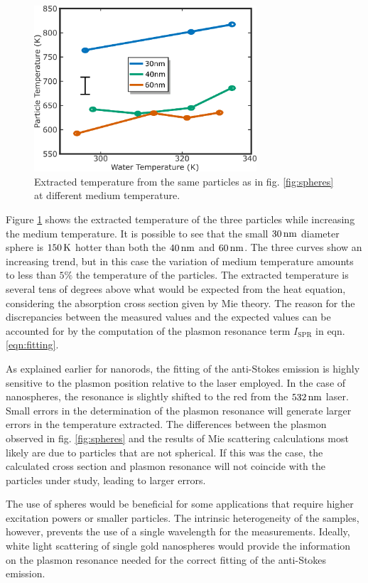 \begin{figure}[tp] \centering
\includegraphics[width=82.7mm]{Chapters/04_Anti-Stokes/Figures/07_Spheres/07_spheres_02.png}
\caption{Extracted temperature from the same particles as in fig.
\ref{fig:spheres} at different medium temperature.}
	\label{fig:spheres_temp}
\end{figure}

Figure \ref{fig:spheres_temp} shows the extracted temperature of the three
particles while increasing the medium temperature. It is possible to see that
the small $30\,\textrm{nm}$ diameter sphere is $150\,\textrm{K}$ hotter than both the $40\,\textrm{nm}$ and
$60\,\textrm{nm}$. The three curves show an increasing trend, but in this case the
variation of medium temperature amounts to less than $5\%$ the temperature of
the particles. The extracted temperature is several tens of degrees above what
would be expected from the heat equation, considering the absorption cross
section given by Mie theory. The reason for the discrepancies between the
measured values and the expected values can be accounted for by the computation
of the plasmon resonance term $I_\textrm{SPR}$ in eqn. \ref{eqn:fitting}.

As explained earlier for nanorods, the fitting of the anti-Stokes emission is
highly sensitive to the plasmon position relative to the laser employed. In the
case of nanospheres, the resonance is slightly shifted to the red from the
$532\,\textrm{nm}$ laser. Small errors in the determination of the plasmon resonance will
generate larger errors in the temperature extracted. The differences between the
plasmon observed in fig. \ref{fig:spheres} and the results of Mie scattering
calculations most likely are due to particles that are not spherical. If this
was the case, the calculated cross section and plasmon resonance will not
coincide with the particles under study, leading to larger errors.

The use of spheres would be beneficial for some applications that require higher
excitation powers or smaller particles. The intrinsic heterogeneity of the
samples, however, prevents the use of a single wavelength for the measurements.
Ideally, white light scattering of single gold nanospheres would provide the
information on the plasmon resonance needed for the correct fitting of the
anti-Stokes emission. 

